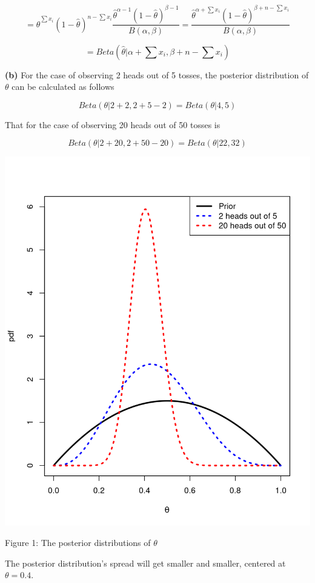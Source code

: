 \documentclass[12pt,article]{article}
\begin{document}
$$
= \hat{\theta}^{\sum x_i} (1 - \hat{\theta})^{n - \sum x_i} \frac{\hat{\theta}^{\alpha - 1}(1 - \hat{\theta})^{\beta - 1}}{B(\alpha,\beta)}
= \frac{\hat{\theta}^{\alpha + \sum x_i} (1 - \hat{\theta})^{\beta + n - \sum x_i}}{B(\alpha,\beta)}
$$

$$
= Beta(\hat{\theta} | \alpha + \sum x_i, \beta + n - \sum x_i) 
$$

\textbf{(b)}
For the case of observing 2 heads out of 5 tosses, the posterior distribution 
of $\theta$ can be calculated as follows

$$Beta(\theta | 2 + 2, 2 + 5 - 2) = Beta(\theta | 4, 5)$$

That for the case of observing 20 heads out of 50 tosses is 

$$Beta(\theta | 2 + 20, 2 + 50 - 20) = Beta(\theta | 22, 32)$$


\begin{center}
    \includegraphics[scale=0.6]{3b.png}
    
    Figure 1: The posterior distributions of $\theta$
\end{center}

The posterior distribution's spread will get smaller and smaller, centered at 
$\theta = 0.4$.
\end{document}
